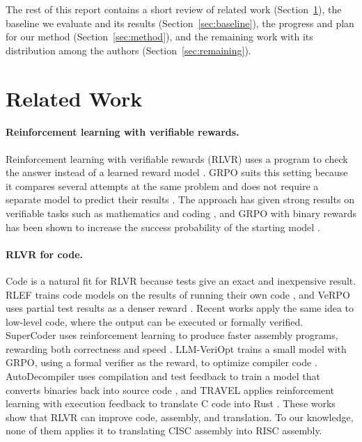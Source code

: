 \documentclass{article}
\begin{document}
The rest of this report contains a short review of related work (Section~\ref{sec:related}), the baseline we evaluate and its results (Section~\ref{sec:baseline}), the progress and plan for our method (Section~\ref{sec:method}), and the remaining work with its distribution among the authors (Section~\ref{sec:remaining}).

\section{Related Work}
\label{sec:related}

\paragraph{Reinforcement learning with verifiable rewards.}
Reinforcement learning with verifiable rewards (RLVR) uses a program to check the answer instead of a learned reward model \citep{tulu3}. GRPO suits this setting because it compares several attempts at the same problem and does not require a separate model to predict their results \citep{deepseekmath}. The approach has given strong results on verifiable tasks such as mathematics and coding \citep{deepseekr1}, and GRPO with binary rewards has been shown to increase the success probability of the starting model \citep{mroueh2025grpo}.

\paragraph{RLVR for code.}
Code is a natural fit for RLVR because tests give an exact and inexpensive result. RLEF trains code models on the results of running their own code \citep{rlef}, and VeRPO uses partial test results as a denser reward \citep{verpo}. Recent works apply the same idea to low-level code, where the output can be executed or formally verified. SuperCoder uses reinforcement learning to produce faster assembly programs, rewarding both correctness and speed \citep{supercoder}. LLM-VeriOpt trains a small model with GRPO, using a formal verifier as the reward, to optimize compiler code \citep{veriopt}. AutoDecompiler uses compilation and test feedback to train a model that converts binaries back into source code \citep{autodecompiler}, and TRAVEL applies reinforcement learning with execution feedback to translate C code into Rust \citep{travel}. These works show that RLVR can improve code, assembly, and translation. To our knowledge, none of them applies it to translating CISC assembly into RISC assembly.
\end{document}
